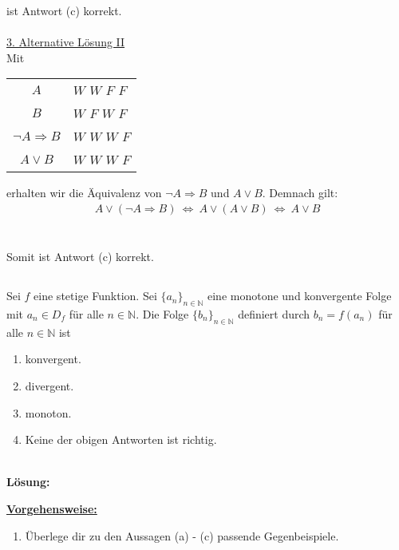 ist Antwort (c) korrekt.
\\
\\
\underline{3. Alternative Lösung II}\\
Mit 
\begin{center}
	\begin{tabular}{cllll}
		\hline
		\multicolumn{1}{c|}{$A$} & \multicolumn{4}{l}{$W$ $W$ $F$ $F$} \\
		\multicolumn{1}{c|}{$B$} & \multicolumn{4}{l}{$W$ $F$ $W$ $F$} \\ \hline
		\multicolumn{1}{c|}{$\neg A \Rightarrow B$} & \multicolumn{4}{l}{$W$ $W$ $W$ $F$}  \\ 
		
		\multicolumn{1}{c|}{$A \vee B$} & \multicolumn{4}{l}{$W$ $W$ $W$ $F$}  \\ \hline
	\end{tabular}
\end{center}
erhalten wir die Äquivalenz von $ \neg A \Rightarrow B $ und $ A \vee B $.
Demnach gilt:
\begin{align*}
A \vee (\neg A \Rightarrow B) 
\ \Leftrightarrow \
A \vee (A \vee B)
\ \Leftrightarrow \
A \vee B 
\end{align*}
\\
\\
Somit ist Antwort (c) korrekt.

\newpage

\subsection*{}
Sei $ f $ eine stetige Funktion. 
Sei $ \lbrace a_n \rbrace_{n \in \mathbb{N}} $ eine monotone und konvergente Folge mit $ a_n \in D_f $ für alle $ n \in \mathbb{N} $.
Die Folge $ \lbrace b_n \rbrace_{n \in \mathbb{N}} $ definiert durch $ b_n = f(a_n) $ für alle $ n \in \mathbb{N} $ ist
\renewcommand{\labelenumi}{(\alph{enumi})}
\begin{enumerate}
	\item konvergent.
	\item divergent.
	\item
	monoton.
	\item
	Keine der obigen Antworten ist richtig.
\end{enumerate}
\ \\
\textbf{Lösung:}
\begin{mdframed}
	\underline{\textbf{Vorgehensweise:}}
	\renewcommand{\labelenumi}{\theenumi.}
	\begin{enumerate}
		\item 
		Überlege dir zu den Aussagen (a) - (c) passende Gegenbeispiele.
	\end{enumerate}
\end{mdframed}

